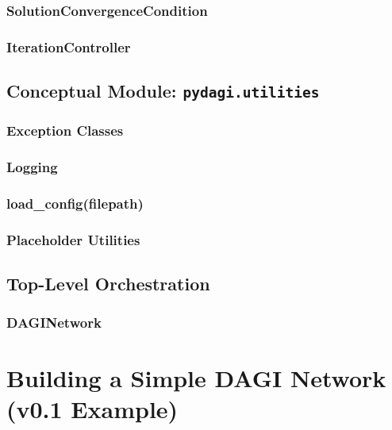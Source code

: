 \documentclass{amsbook}
\theoremstyle{definition}
\theoremstyle{remark}
\numberwithin{equation}{chapter} %
\begin{document}
        \subsection{SolutionConvergenceCondition}
        \subsection{IterationController}
    \section{Conceptual Module: \texttt{pydagi.utilities}}
        \subsection{Exception Classes}
        \subsection{Logging}
        \subsection{load\_config(filepath)}
        \subsection{Placeholder Utilities}
    \section{Top-Level Orchestration}
        \subsection{DAGINetwork}

\chapter{Building a Simple DAGI Network (v0.1 Example)}
\end{document}
